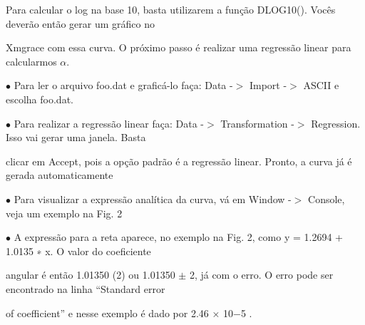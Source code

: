 \documentclass[a4paper,portrait,12pt]{article}
\begin{document}
\begin{flushleft}
Para calcular o log na base 10, basta utilizarem a fun\c{c}\~{a}o DLOG10(). Voc\^{e}s dever\~{a}o ent\~{a}o gerar um gr\'{a}fico no
\end{flushleft}


\begin{flushleft}
Xmgrace com essa curva. O pr\'{o}ximo passo \'{e} realizar uma regress\~{a}o linear para calcularmos $\alpha$.
\end{flushleft}


\begin{flushleft}
$\bullet$ Para ler o arquivo foo.dat e grafic\'{a}-lo fa\c{c}a: Data -$>$ Import -$>$ ASCII e escolha foo.dat.
\end{flushleft}


\begin{flushleft}
$\bullet$ Para realizar a regress\~{a}o linear fa\c{c}a: Data -$>$ Transformation -$>$ Regression. Isso vai gerar uma janela. Basta
\end{flushleft}


\begin{flushleft}
clicar em Accept, pois a op\c{c}\~{a}o padr\~{a}o \'{e} a regress\~{a}o linear. Pronto, a curva j\'{a} \'{e} gerada automaticamente
\end{flushleft}


\begin{flushleft}
$\bullet$ Para visualizar a express\~{a}o anal\'{i}tica da curva, v\'{a} em Window -$>$ Console, veja um exemplo na Fig. 2
\end{flushleft}


\begin{flushleft}
$\bullet$ A express\~{a}o para a reta aparece, no exemplo na Fig. 2, como y = 1.2694 + 1.0135 ∗ x. O valor do coeficiente
\end{flushleft}


\begin{flushleft}
angular \'{e} ent\~{a}o 1.01350 (2) ou 1.01350 $\pm$ 2, j\'{a} com o erro. O erro pode ser encontrado na linha {``}Standard error
\end{flushleft}


\begin{flushleft}
of coefficient'' e nesse exemplo \'{e} dado por 2.46 × 10$-$5 .
\end{flushleft}





\newpage
\end{document}
